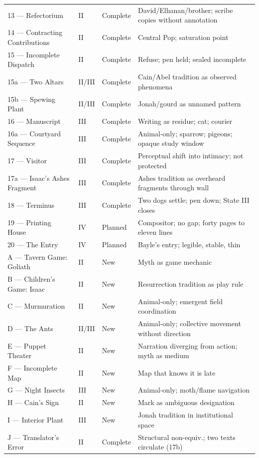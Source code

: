 \documentclass[12pt, oneside]{amsart}
\begin{document}
\begin{longtable}{p{3.2cm}p{1.5cm}p{1.5cm}p{5.8cm}}
13 — Refectorium & II & Complete & David/Elhanan/brother; scribe copies without annotation \\
14 — Contracting Contributions & II & Complete & Central Pop; saturation point \\
15 — Incomplete Dispatch & II & Complete & Refuse; pen held; sealed incomplete \\
15a — Two Altars & II/III & Complete & Cain/Abel tradition as observed phenomena \\
15b — Spewing Plant & II/III & Complete & Jonah/gourd as unnamed pattern \\
16 — Manuscript & III & Complete & Writing as residue; cat; courier \\
16a — Courtyard Sequence & III & Complete & Animal-only; sparrow; pigeons; opaque study window \\
17 — Visitor & III & Complete & Perceptual shift into intimacy; not protected \\
17a — Isaac's Ashes Fragment & III & Complete & Ashes tradition as overheard fragments through wall \\
18 — Terminus & III & Complete & Two dogs settle; pen down; State III closes \\
19 — Printing House & IV & Planned & Compositor; no gap; forty pages to eleven lines \\
20 — The Entry & IV & Planned & Bayle's entry; legible, stable, thin \\
A — Tavern Game: Goliath & II & New & Myth as game mechanic \\
B — Children's Game: Isaac & II & New & Resurrection tradition as play rule \\
C — Murmuration & II & New & Animal-only; emergent field coordination \\
D — The Ants & II/III & New & Animal-only; collective movement without direction \\
E — Puppet Theater & II & New & Narration diverging from action; myth as medium \\
F — Incomplete Map & II & New & Map that knows it is late \\
G — Night Insects & III & New & Animal-only; moth/flame navigation \\
H — Cain's Sign & II & New & Mark as ambiguous designation \\
I — Interior Plant & III & New & Jonah tradition in institutional space \\
J — Translator's Error & II & Complete & Structural non-equiv.; two texts circulate (17b) \\

\end{longtable}
\end{document}
